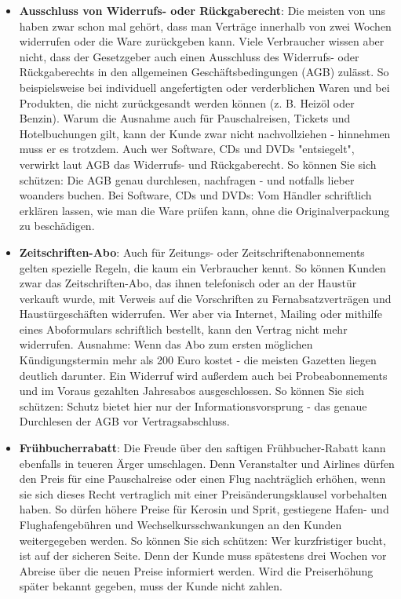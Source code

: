 \documentclass[a4paper]{article}
\begin{document}
\begin{itemize}
\item \textbf{Ausschluss von Widerrufs- oder Rückgaberecht}: Die meisten von uns haben zwar schon mal gehört, dass man Verträge innerhalb von zwei Wochen widerrufen oder die Ware zurückgeben kann. Viele Verbraucher wissen aber nicht, dass der Gesetzgeber auch einen Ausschluss des Widerrufs- oder Rückgaberechts in den allgemeinen Geschäftsbedingungen (AGB) zulässt. So beispielsweise bei individuell angefertigten oder verderblichen Waren und bei Produkten, die nicht zurückgesandt werden können (z. B. Heizöl oder Benzin). Warum die Ausnahme auch für Pauschalreisen, Tickets und Hotelbuchungen gilt, kann der Kunde zwar nicht nachvollziehen - hinnehmen muss er es trotzdem. Auch wer Software, CDs und DVDs "entsiegelt", verwirkt laut AGB das Widerrufs- und Rückgaberecht. So können Sie sich schützen: Die AGB genau durchlesen, nachfragen - und notfalls lieber woanders buchen. Bei Software, CDs und DVDs: Vom Händler schriftlich erklären lassen, wie man die Ware prüfen kann, ohne die Originalverpackung zu beschädigen.

\item \textbf{Zeitschriften-Abo}: Auch für Zeitungs- oder Zeitschriftenabonnements gelten spezielle Regeln, die kaum ein Verbraucher kennt. So können Kunden zwar das Zeitschriften-Abo, das ihnen telefonisch oder an der Haustür verkauft wurde, mit Verweis auf die Vorschriften zu Fernabsatzverträgen und Haustürgeschäften widerrufen. Wer aber via Internet, Mailing oder mithilfe eines Aboformulars schriftlich bestellt, kann den Vertrag nicht mehr widerrufen. Ausnahme: Wenn das Abo zum ersten möglichen Kündigungstermin mehr als 200 Euro kostet - die meisten Gazetten liegen deutlich darunter. Ein Widerruf wird außerdem auch bei Probeabonnements und im Voraus gezahlten Jahresabos ausgeschlossen. So können Sie sich schützen: Schutz bietet hier nur der Informationsvorsprung - das genaue Durchlesen der AGB vor Vertragsabschluss.

\item \textbf{Frühbucherrabatt}: Die Freude über den saftigen Frühbucher-Rabatt kann ebenfalls in teueren Ärger umschlagen. Denn Veranstalter und Airlines dürfen den Preis für eine Pauschalreise oder einen Flug nachträglich erhöhen, wenn sie sich dieses Recht vertraglich mit einer Preisänderungsklausel vorbehalten haben. So dürfen höhere Preise für Kerosin und Sprit, gestiegene Hafen- und Flughafengebühren und Wechselkursschwankungen an den Kunden weitergegeben werden. So können Sie sich schützen: Wer kurzfristiger bucht, ist auf der sicheren Seite. Denn der Kunde muss spätestens drei Wochen vor Abreise über die neuen Preise informiert werden. Wird die Preiserhöhung später bekannt gegeben, muss der Kunde nicht zahlen.


\end{itemize}
\end{document}
